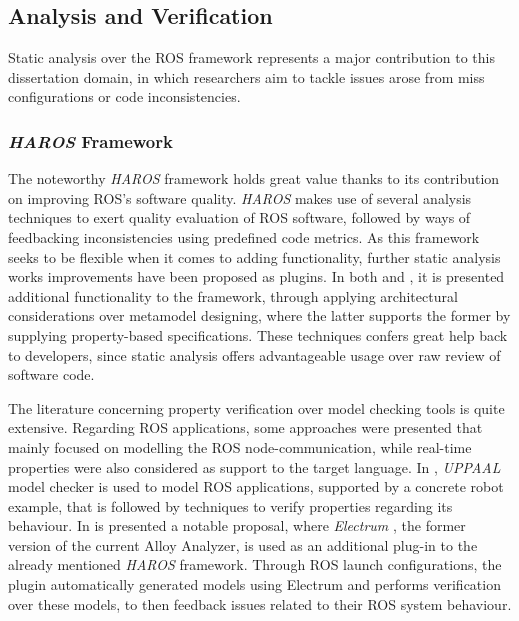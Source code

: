 \subsection{Analysis and Verification}\label{s:relWork-pv}

Static analysis over the ROS framework represents a major contribution to this dissertation domain, in which researchers aim to tackle issues arose from miss configurations or code inconsistencies. 

\subsubsection{\textit{HAROS} Framework}

The noteworthy \textit{HAROS} framework \cite{santos2016framework} holds great value thanks to its contribution on improving ROS's software quality. \textit{HAROS} makes use of several analysis techniques to exert quality evaluation of ROS software, followed by ways of feedbacking inconsistencies using predefined code metrics. As this framework seeks to be flexible when it comes to adding functionality, further static analysis works improvements have been proposed as plugins. In both  and , it is presented additional functionality to the framework, through applying architectural considerations over metamodel designing, where the latter supports the former by supplying property-based specifications. These techniques confers great help back to developers, since static analysis offers advantageable usage over raw review of software code. 

The literature concerning property verification over model checking tools is quite extensive. Regarding ROS applications, some approaches were presented that mainly focused on modelling the ROS node-communication, while real-time properties were also considered as support to the target language. In , \textit{UPPAAL} model checker is used to model ROS applications, supported by a concrete robot example, that is followed by techniques to verify properties regarding its behaviour. In  is presented a notable proposal, where \textit{Electrum} \cite{lwspecification}, the former version of the current Alloy Analyzer, is used as an additional plug-in to the already mentioned \textit{HAROS} framework. Through ROS launch configurations, the plugin automatically generated models using Electrum and performs verification over these models, to then feedback issues related to their ROS system behaviour.

